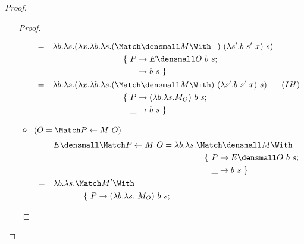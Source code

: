 \begin{proof}
\begin{enumerate}[(a)]
\begin{proof}
\begin{itemize}
\begin{align*}
            =& \quad \lambda b. \lambda s. (\lambda x. \lambda b. \lambda s. (
            \begin{aligned}[t]
              &\Match \den{M} \With \\
              &\quad
              \begin{aligned}[t]
                \{~
                P &\to E\den{O}~b~s; \\
                \_ &\to b~s
                ~\}
              \end{aligned}
            \end{aligned}
            )~ (\lambda s'. b ~ s' ~ x) ~ s) \\
            =& \quad \lambda b. \lambda s. (\lambda x. \lambda b. \lambda s. (
            \begin{aligned}[t]
              &\Match \den{M} \With \\
              &\quad
              \begin{aligned}[t]
                \{~
                P &\to (\lambda b. \lambda s. M_O)~b~s; \\
                \_ &\to b~s
                ~\}
              \end{aligned}
            \end{aligned}
            )~ (\lambda s'. b ~ s' ~ x) ~ s) & (IH)
            \end{align*}
    \item $(O = \Match P \gets M ~ O)$
        \begin{align*}
            & \quad E\den{\Match P \gets M ~ O} = \lambda b. \lambda s.
            \begin{aligned}[t]
              &\Match \den{M} \With \\
              &\quad
              \begin{aligned}[t]
                \{~
                P &\to E\den{O}~b~s; \\
                \_ &\to b~s
                ~\}
              \end{aligned}
            \end{aligned} \\
            =& \quad \lambda b. \lambda s.
            \begin{aligned}[t]
              &\Match M' \With \\
              &\quad
              \begin{aligned}[t]
                \{~
                P &\to (\lambda b. \lambda s.~ M_O) ~b~s; \\

\end{aligned}
\end{aligned}
\end{align*}
\end{itemize}
\end{proof}
\end{enumerate}
\end{proof}
